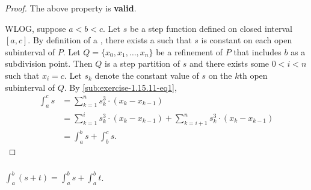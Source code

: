 \documentclass{report}
\begin{document}
\begin{proof}

  The above property is \textbf{valid}.

  \vspace{6pt}

  WLOG, suppose $a < b < c$.
  Let $s$ be a step function defined on closed interval $[a, c]$.
  By definition of a , there exists a
     such that $s$ is constant on each open
    subinterval of $P$.
  Let $Q = \{x_0, x_1, \ldots, x_n\}$ be a refinement of $P$ that includes $b$
    as a subdivision point.
  Then $Q$ is a step partition of $s$ and there exists some $0 < i < n$ such
    that $x_i = c$.
  Let $s_k$ denote the constant value of $s$ on the $k$th open subinterval of
    $Q$.
  By \eqref{sub:exercise-1.15.11-eq1},
    \begin{align*}
      \int_a^c s
        & = \sum_{k=1}^n s_k^3 \cdot (x_k - x_{k-1}) \\
        & = \sum_{k=1}^i s_k^3 \cdot (x_k - x_{k-1}) +
            \sum_{k=i+1}^n s_k^3 \cdot (x_k - x_{k-1}) \\
        & = \int_a^b s + \int_b^c s.
    \end{align*}

\end{proof}

\subsubsection{}%
\label{ssub:exercise-1.15.11b}

$\int_a^b (s + t) = \int_a^b s + \int_a^b t$.

\end{document}
